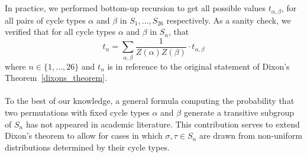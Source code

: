 \\\\In practice, we performed bottom-up recursion to get all possible
values $t_{\alpha,\beta}$, for all pairs of cycle types $\alpha$ and
$\beta$ in $S_1, \dots, S_{26}$ respectively. As a sanity check, we
verified that for all cycle types $\alpha$ and $\beta$ in $S_n$, that
\[
  t_n = \sum_{\alpha,\beta}\frac{1}{Z(\alpha)Z(\beta)}\cdot t_{\alpha,\beta}
\]
where $n\in\{1,\dots,26\}$ and $t_n$ is in reference to the original
statement of Dixon's Theorem~\ref{dixons_theorem}.
\\\\To the best of our
knowledge, a general formula computing the probability that two
permutations with fixed cycle types $\alpha$ and $\beta$ generate a
transitive subgroup of $S_n$ has not appeared in academic literature. This
contribution serves to extend Dixon's theorem to allow for cases in
which $\sigma,\tau\in S_n$ are drawn from non-uniform distributions
determined by their cycle types.
